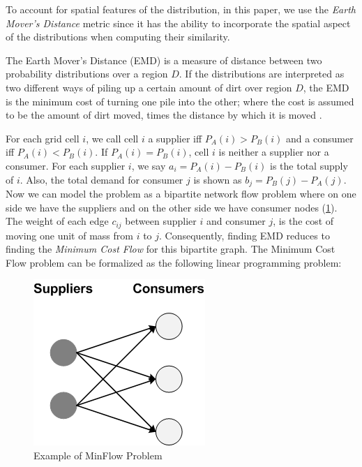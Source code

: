 To account for spatial features of the distribution, in this paper, we use the \textit{Earth Mover's Distance} metric since it has the ability to incorporate the spatial aspect of the distributions when computing their similarity.

\begin{definition}
The Earth Mover's Distance (EMD) is a measure of distance between two probability distributions over a region $D$. If the distributions are interpreted as two different ways of piling up a certain amount of dirt over region $D$, the EMD is the minimum cost of turning one pile into the other; where the cost is assumed to be the amount of dirt moved, times the distance by which it is moved \cite{Rubner98}.
\end{definition}

For each grid cell $i$, we call cell $i$ a supplier iff $P_A(i) > P_B(i)$ and a consumer iff $P_A(i) < P_B(i)$. If $P_A(i) = P_B(i)$, cell $i$ is neither a supplier nor a consumer. For each supplier $i$, we say $a_i = P_A(i) - P_B(i)$ is the total supply of $i$. Also, the total demand for consumer $j$ is shown as $b_j = P_B(j) - P_A(j)$. Now we can model the problem as a bipartite network flow problem where on one side we have the suppliers and on the other side we have consumer nodes (\cref{fig:MinFlow}). The weight of each edge $c_{ij}$ between supplier $i$ and consumer $j$, is the cost of moving one unit of mass from $i$ to $j$.  Consequently, finding EMD reduces to finding the \textit{Minimum Cost Flow} for this bipartite graph. The Minimum Cost Flow problem can be formalized as the following linear programming problem:

\begin{figure}[t]
  \centering
  \label{fig:MinFlow}
  \includegraphics[scale=0.4]{figures/MinFlow.png}
  \caption{Example of MinFlow Problem}
\end{figure}

